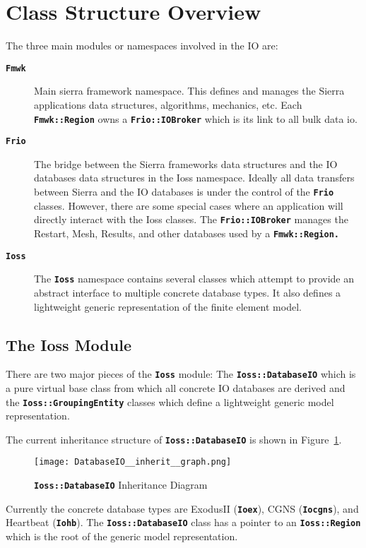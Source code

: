 \documentclass[11pt,twoside]{article}
\newcommand{\code}[1]
   {\mbox{\bf\tt #1}\null}
\begin{document}
\section{Class Structure Overview}
The three main modules or namespaces involved in the IO are:
\begin{description}
\item [\code{Fmwk}] Main sierra framework namespace. This
defines and manages the Sierra applications data structures,
algorithms, mechanics, etc. Each \code{Fmwk::Region} owns a
\code{Frio::IOBroker} which is its link to all bulk data io.
\item [\code{Frio}] The bridge between the Sierra frameworks
data structures and the IO databases data structures in the Ioss
namespace. Ideally all data transfers between Sierra and the IO
databases is under the control of the \code{Frio} classes.
However, there are some special cases where an application will
directly interact with the Ioss classes. The
\code{Frio::IOBroker} manages the Restart, Mesh, Results, and
other databases used by a \code{Fmwk::Region.}
\item [\code{Ioss}] The \code{Ioss} namespace
contains several classes which attempt to provide an abstract interface
to multiple concrete database types. It also defines a lightweight
generic representation of the finite element model.
\end{description}

\subsection{The Ioss Module}
There are two major pieces of the \code{Ioss} module: The
\code{Ioss::DatabaseIO} which is a pure virtual base class
from which all concrete IO databases are derived and the
\code{Ioss::GroupingEntity} classes which define a
lightweight generic model representation.

The current inheritance structure of
\code{Ioss::DatabaseIO} is shown in Figure~\ref{fig:dbio_inherit}.
\begin{figure}[htp]
\centering
\texttt{[image: DatabaseIO\_\_inherit\_\_graph.png]}
\caption{\code{Ioss::DatabaseIO} Inheritance Diagram}\label{fig:dbio_inherit}
\end{figure}
Currently the concrete database types are ExodusII (\code{Ioex}), CGNS
(\code{Iocgns}), and Heartbeat (\code{Iohb}). The
\code{Ioss::DatabaseIO} class has a pointer to an \code{Ioss::Region
}which is the root of the generic model representation.
\end{document}
